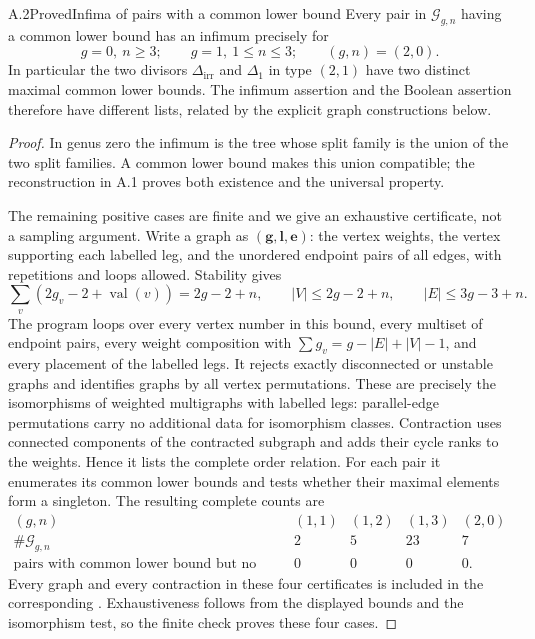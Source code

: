 \begin{result}{A.2}{Proved}{Infima of pairs with a common lower bound}
Every pair in $\mathcal G_{g,n}$ having a common lower bound has an infimum precisely for
\[
 g=0,\ n\geq3;\qquad g=1,\ 1\leq n\leq3;\qquad(g,n)=(2,0).
\]
In particular the two divisors $\Delta_{\mathrm{irr}}$ and $\Delta_1$ in type $(2,1)$ have two distinct maximal common lower bounds. The infimum assertion and the Boolean assertion therefore have different lists, related by the explicit graph constructions below.
\end{result}
\begin{proof}
In genus zero the infimum is the tree whose split family is the union of the two split families. A common lower bound makes this union compatible; the reconstruction in A.1 proves both existence and the universal property.

The remaining positive cases are finite and we give an exhaustive certificate, not a sampling argument. Write a graph as $(\mathbf g,\mathbf l,\mathbf e)$: the vertex weights, the vertex supporting each labelled leg, and the unordered endpoint pairs of all edges, with repetitions and loops allowed. Stability gives
\[
 \sum_v(2g_v-2+\operatorname{val}(v))=2g-2+n,
 \qquad |V|\leq 2g-2+n,\qquad |E|\leq3g-3+n.
\]
The program  loops over every vertex number in this bound, every multiset of endpoint pairs, every weight composition with $\sum g_v=g-|E|+|V|-1$, and every placement of the labelled legs. It rejects exactly disconnected or unstable graphs and identifies graphs by all vertex permutations. These are precisely the isomorphisms of weighted multigraphs with labelled legs: parallel-edge permutations carry no additional data for isomorphism classes. Contraction uses connected components of the contracted subgraph and adds their cycle ranks to the weights. Hence it lists the complete order relation. For each pair it enumerates its common lower bounds and tests whether their maximal elements form a singleton. The resulting complete counts are
\[
\begin{array}{c|rrrr}
 (g,n)&(1,1)&(1,2)&(1,3)&(2,0)\\\hline
 \#\mathcal G_{g,n}&2&5&23&7\\
 \text{pairs with common lower bound but no infimum}&0&0&0&0.
\end{array}
\]
Every graph and every contraction in these four certificates is included in the corresponding . Exhaustiveness follows from the displayed bounds and the isomorphism test, so the finite check proves these four cases.


\end{proof}
